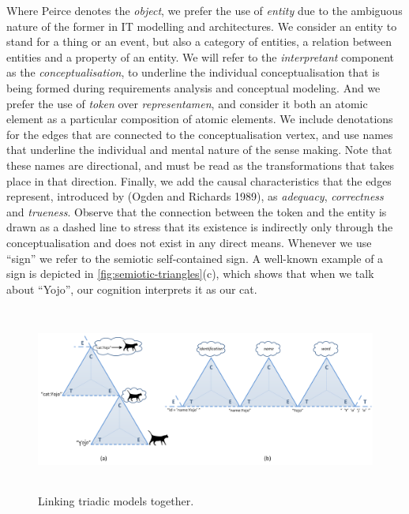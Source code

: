 \documentclass[a4paper,11pt,oneside,oldfontcommands]{memoir}
\theoremstyle{definition}
\theoremstyle{break}		%
\numberwithin{equation}{chapter}
\numberwithin{figure}{chapter}
\begin{document}
Where Peirce denotes the \emph{object}, we prefer the use of
\emph{entity} due to the ambiguous nature of the former in IT modelling
and architectures. We consider an entity to stand for a thing or an
event, but also a category of entities, a relation between entities and
a property of an entity. We will refer to the \emph{interpretant}
component as the \emph{conceptualisation}, to underline the individual
conceptualisation that is being formed during requirements analysis and
conceptual modeling. And we prefer the use of \emph{token} over
\emph{representamen}, and consider it both an atomic element as a
particular composition of atomic elements. We include denotations for
the edges that are connected to the conceptualisation vertex, and use
names that underline the individual and mental nature of the sense
making. Note that these names are directional, and must be read as the
transformations that takes place in that direction. Finally, we add the
causal characteristics that the edges represent, introduced by (Ogden
and Richards 1989), as \emph{adequacy}, \emph{correctness} and
\emph{trueness}. Observe that the connection between the token and the
entity is drawn as a dashed line to stress that its existence is
indirectly only through the conceptualisation and does not exist in any
direct means. Whenever we use ``sign'' we refer to the semiotic
self-contained sign. A well-known example of a sign is depicted in
\cref{fig:semiotic-triangles}(c), which shows that when we talk about
``Yojo'', our cognition interprets it as our cat.

\begin{figure}
\hypertarget{fig:linked-triangles}{%
\centering
\includegraphics[width=6.25in,height=2.39583in]{src/images/LinkedTriangles.png}
\caption{Linking triadic models together.}\label{fig:linked-triangles}
}
\end{figure}
\end{document}
